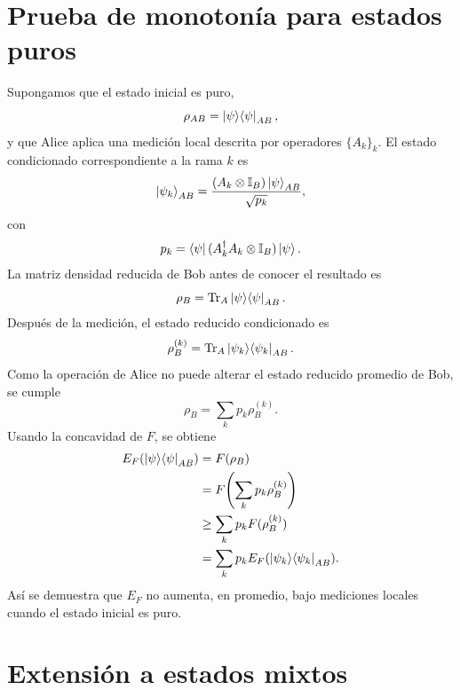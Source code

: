 \documentclass[../main.tex]{subfiles}
\begin{document}
\section{Prueba de monotonía para estados puros}

Supongamos que el estado inicial es puro,
\begin{equation*}
    \rho_{AB}=\ket{\psi}\!\bra{\psi}_{AB},
\end{equation*}
y que Alice aplica una medición local descrita por operadores \(\{A_k\}_k\). El estado condicionado correspondiente a la rama \(k\) es
\begin{equation*}
    \ket{\psi_k}_{AB}
    =
    \frac{(A_k\otimes\mathbb{I}_B)\ket{\psi}_{AB}}{\sqrt{p_k}},
\end{equation*}
con
\begin{equation*}
    p_k=\bra{\psi}(A_k^\dagger A_k\otimes\mathbb{I}_B)\ket{\psi}.
\end{equation*}
La matriz densidad reducida de Bob antes de conocer el resultado es
\begin{equation*}
    \rho_B=\Tr_A\ket{\psi}\!\bra{\psi}_{AB}.
\end{equation*}
Después de la medición, el estado reducido condicionado es
\begin{equation*}
    \rho_B^{(k)}=\Tr_A\ket{\psi_k}\!\bra{\psi_k}_{AB}.
\end{equation*}
Como la operación de Alice no puede alterar el estado reducido promedio de Bob, se cumple
\begin{equation}
    \rho_B=\sum_k p_k\rho_B^{(k)}.
    \label{eq:reducida-bob-promedio}
\end{equation}
Usando la concavidad de \(F\), se obtiene
\begin{align*}
    E_F(\ket{\psi}\!\bra{\psi}_{AB})
    &=F(\rho_B) \\
    &=F\!\left(\sum_k p_k\rho_B^{(k)}\right) \\
    &\geq \sum_k p_k F(\rho_B^{(k)}) \\
    &=\sum_k p_k E_F(\ket{\psi_k}\!\bra{\psi_k}_{AB}).
\end{align*}
Así se demuestra que \(E_F\) no aumenta, en promedio, bajo mediciones locales cuando el estado inicial es puro.

\section{Extensión a estados mixtos}
\end{document}

